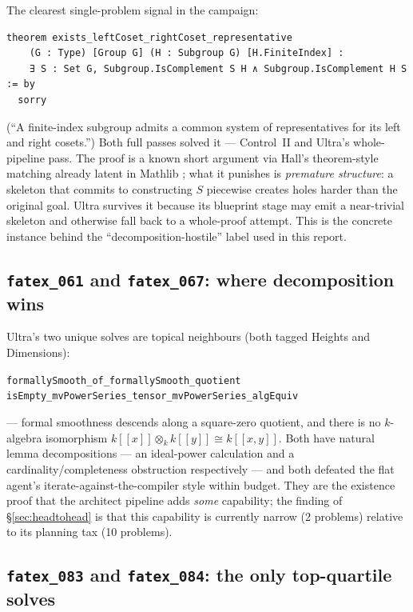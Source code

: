 \documentclass[12pt, a4paper]{article}
\newcommand{\run}[1]{\texttt{#1}}
\begin{document}
The clearest single-problem signal in the campaign:

\begin{lstlisting}
theorem exists_leftCoset_rightCoset_representative
    (G : Type) [Group G] (H : Subgroup G) [H.FiniteIndex] :
    ∃ S : Set G, Subgroup.IsComplement S H ∧ Subgroup.IsComplement H S := by
  sorry
\end{lstlisting}

\noindent
(``A finite-index subgroup admits a common system of representatives for its
left and right cosets.'') Both full passes solved it --- Control~II and Ultra's
whole-pipeline pass. The proof is a known short argument via Hall's
theorem-style matching already latent in Mathlib \cite{mathlib2020}; what it
punishes is \emph{premature structure}: a skeleton that commits to
constructing $S$ piecewise creates holes harder than the original goal.
Ultra survives it because its blueprint stage may emit a near-trivial
skeleton and otherwise fall back to a whole-proof attempt. This is the concrete
instance behind the ``decomposition-hostile'' label used in this report.

\subsection{\run{fatex\_061} and \run{fatex\_067}: where decomposition wins}

Ultra's two unique solves are topical neighbours (both tagged Heights and
Dimensions):
\begin{center}\small
\run{formallySmooth\_of\_formallySmooth\_quotient}\\
\run{isEmpty\_mvPowerSeries\_tensor\_mvPowerSeries\_algEquiv}
\end{center}
\noindent
--- formal smoothness descends along a square-zero quotient, and there is no
$k$-algebra isomorphism $k[[x]] \otimes_k k[[y]] \cong k[[x,y]]$. Both have
natural lemma decompositions --- an ideal-power calculation and a
cardinality/completeness obstruction respectively --- and both defeated the
flat agent's iterate-against-the-compiler style within budget. They are the
existence proof that the architect pipeline adds \emph{some} capability;
the finding of \S\ref{sec:headtohead} is that this capability is currently
narrow (2 problems) relative to its planning tax (10 problems).

\subsection{\run{fatex\_083} and \run{fatex\_084}: the only top-quartile solves}
\end{document}
